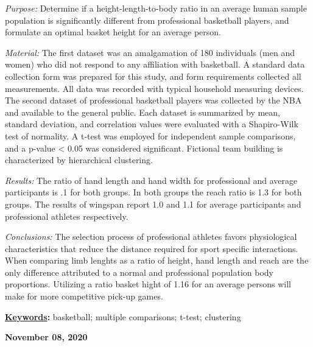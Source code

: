 \documentclass[]{article}
\renewenvironment{abstract}
 {{%
    \setlength{\leftmargin}{0mm}
    \setlength{\rightmargin}{\leftmargin}%
  }%
  \relax}
 {\endlist}
\begin{document}
\begin{abstract}

    \hbox{\vrule height .2pt width 39.14pc}

    \vskip 8.5pt %

\noindent \noindent \emph{Purpose:} Determine if a height-length-to-body ratio in
an average human sample population is significantly different from
professional basketball players, and formulate an optimal basket height
for an average person.\vspace{0.25in}

\noindent \emph{Material:} The first dataset was an amalgamation of 180
individuals (men and women) who did not respond to any affiliation with
basketball. A standard data collection form was prepared for this study,
and form requirements collected all measurements. All data was recorded
with typical household measuring devices. The second dataset of
professional basketball players was collected by the NBA and available
to the general public. Each dataset is summarized by mean, standard
deviation, and correlation values were evaluated with a Shapiro-Wilk
test of normality. A t-test was employed for independent sample
comparisons, and a p-value \textless{} 0.05 was considered significant.
Fictional team building is characterized by hierarchical clustering.
\vspace{0.25in}

\noindent \emph{Results:} The ratio of hand length and hand width for
professional and average participants is .1 for both groups. In both
groups the reach ratio is 1.3 for both groups. The results of wingspan
report 1.0 and 1.1 for average participants and professional athletes
respectively. \vspace{0.25in}

\noindent \emph{Conclusions:} The selection process of professional
athletes favors physiological characteristics that reduce the distance
required for sport specific interactions. When comparing limb lenghts as
a ratio of height, hand length and reach are the only difference
attributed to a normal and professional population body proportions.
Utilizing a ratio basket hight of 1.16 for an average persons will make
for more competitive pick-up games. \vspace{0.25in}


\vskip 8.5pt \noindent \textbf{\underline{Keywords}:} basketball; multiple comparisons; t-test; clustering \par

    




    
    \hbox{\vrule height .2pt width 39.14pc}
    \vskip 5pt 
    \hfill \textbf{\textcolor{WSU.gray}{ November 08, 2020 } }
    \vskip 5pt 
    
\end{abstract}
\end{document}
